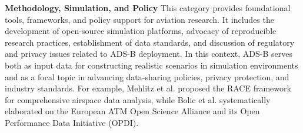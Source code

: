 \textbf{Methodology, Simulation, and Policy}
This category provides foundational tools, frameworks, and policy support for aviation research. It includes the development of open-source simulation platforms, advocacy of reproducible research practices, establishment of data standards, and discussion of regulatory and privacy issues related to ADS-B deployment. In this context, ADS-B serves both as input data for constructing realistic scenarios in simulation environments and as a focal topic in advancing data-sharing policies, privacy protection, and industry standards. For example, Mehlitz et al. \cite{mehlitz2019analyzing} proposed the RACE framework for comprehensive airspace data analysis, while Bolic et al. \cite{bolic2024roadmap} systematically elaborated on the European ATM Open Science Alliance and its Open Performance Data Initiative (OPDI).

